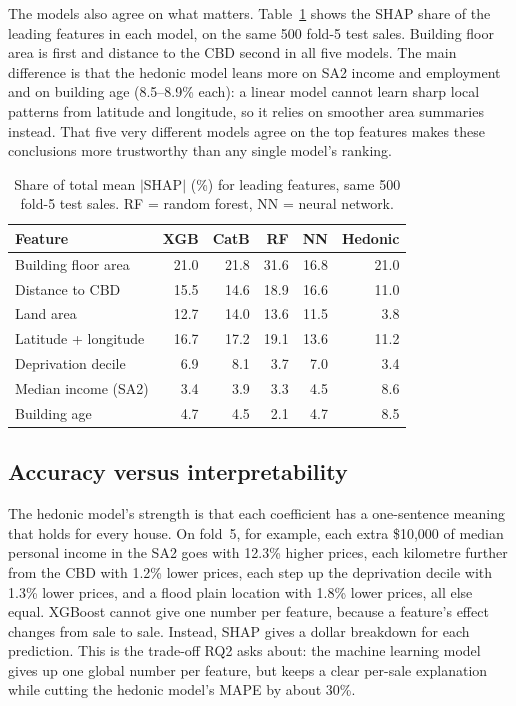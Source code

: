 \documentclass[conference]{IEEEtran}
\begin{document}
The models also agree on what matters. Table~\ref{tab:shapmodels} shows
the SHAP share of the leading features in each model, on the same 500
fold-5 test sales. Building floor area is first and distance to the CBD
second in all five models. The main difference is that the hedonic model
leans more on SA2 income and employment and on building age (8.5--8.9\%
each): a linear model cannot learn
sharp local patterns from latitude and longitude, so it relies on
smoother area summaries instead. That five very different models agree
on the top features makes these conclusions more trustworthy than any
single model's ranking.

\begin{table}[t]
  \centering
  \caption{Share of total mean $|$SHAP$|$ (\%) for leading features,
  same 500 fold-5 test sales. RF = random forest, NN = neural
  network.}
  \label{tab:shapmodels}
  \begin{tabular}{@{}lrrrrr@{}}
    \toprule
    Feature & XGB & CatB & RF & NN & Hedonic \\
    \midrule
    Building floor area   & 21.0 & 21.8 & 31.6 & 16.8 & 21.0 \\
    Distance to CBD       & 15.5 & 14.6 & 18.9 & 16.6 & 11.0 \\
    Land area             & 12.7 & 14.0 & 13.6 & 11.5 & 3.8 \\
    Latitude + longitude  & 16.7 & 17.2 & 19.1 & 13.6 & 11.2 \\
    Deprivation decile    & 6.9  & 8.1  & 3.7  & 7.0  & 3.4 \\
    Median income (SA2)   & 3.4  & 3.9  & 3.3  & 4.5  & 8.6 \\
    Building age          & 4.7  & 4.5  & 2.1  & 4.7  & 8.5 \\
    \bottomrule
  \end{tabular}
\end{table}

\subsection{Accuracy versus interpretability}\label{sec:res-hedonic}
The hedonic model's strength is that each coefficient has a one-sentence
meaning that holds for every house. On fold~5, for example, each extra
\$10,000 of median personal income in the SA2 goes with 12.3\% higher
prices, each kilometre further from the CBD with 1.2\% lower prices, each
step up the deprivation decile with 1.3\% lower prices, and a flood
plain location with 1.8\% lower prices, all else equal. XGBoost cannot
give one number per feature, because a feature's effect changes from
sale to sale. Instead, SHAP gives a dollar breakdown for each
prediction. This is the trade-off RQ2 asks about: the machine learning
model gives up one global number per feature, but keeps a clear per-sale
explanation while cutting the hedonic model's MAPE by about 30\%.
\end{document}
